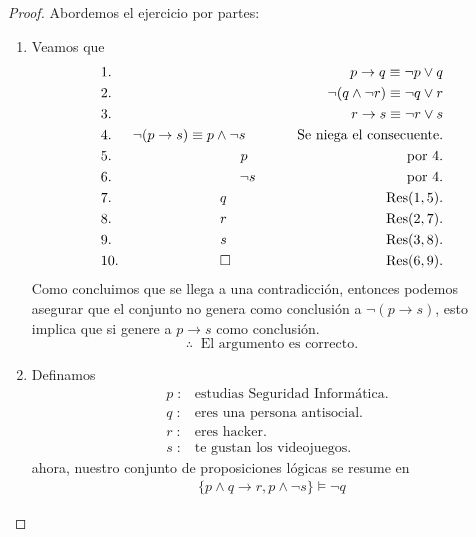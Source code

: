 \documentclass{article}
\begin{document}
\begin{itemize}
  \begin{proof} Abordemos el ejercicio por partes:
    \begin{enumerate}
    \item Veamos que
      \begin{eqnarray*}
        &1.& p \rightarrow q \equiv \neg p \lor q\\
        &2.& \neg (q \land \neg r) \equiv  \neg q \lor r\\
        &3.& r \rightarrow s \equiv \neg r \lor s\\
        &4.& \neg (p \rightarrow s) \equiv p \land \neg s
        \hspace*{1.3cm} \text{Se niega el consecuente.}\\
        &5.& p \hspace*{4cm} \text{por } 4.\\
        &6.& \neg s \hspace*{3.8cm} \text{por } 4.\\
        &7.& q \hspace*{4cm} \text{Res}(1,5).\\
        &8.& r \hspace*{4cm} \text{Res}(2,7).\\
        &9.& s \hspace*{4cm} \text{Res}(3,8).\\
        &10.& \square \hspace*{3.9cm} \text{Res}(6,9).
      \end{eqnarray*}
      Como concluimos que se llega a una contradicción, entonces
      podemos asegurar que el conjunto no genera como conclusión
      a $\neg (p \rightarrow s)$, esto implica que si genere a
      $p \rightarrow s$ como conclusión.
      \[
      \therefore\;\; \text{El argumento es correcto.}
      \]
    \item Definamos
      \begin{eqnarray*}
        &p\; :& \text{estudias Seguridad Informática}.\\
        &q\; :& \text{eres una persona antisocial}.\\
        &r\; :& \text{eres hacker}.\\
        &s\; :& \text{te gustan los videojuegos}.
      \end{eqnarray*}
      ahora, nuestro conjunto de proposiciones lógicas se resume en
      \begin{eqnarray*}
        \{p \land q \rightarrow r, p \land \neg s\} \models \neg q
      \end{eqnarray*}

\end{enumerate}
\end{proof}
\end{itemize}
\end{document}

